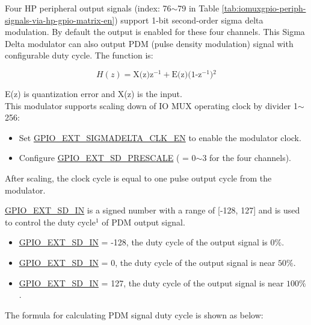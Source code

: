 \documentclass[main\_\_EN.tex]{subfiles}
\begin{document}
Four HP peripheral output signals (index: 76$\sim$79 in Table \ref{tab:iomuxgpio-periph-signals-via-hp-gpio-matrix-en}) support 1-bit second-order sigma delta modulation. By default the output is enabled for these four channels. This Sigma Delta modulator can also output PDM (pulse density modulation) signal with configurable duty cycle. The function is:

\[
    H(z)=\textrm{X(z)z$^{-1}$} + \textrm{E(z)(1-z$^{-1}$)$^{2}$}
    \]

E(z) is quantization error and X(z) is the input.\\
This modulator supports scaling down of IO MUX operating clock by divider 1$\sim$256:
\begin{itemize}
    \item Set  \hyperref[fielddesc:GPIOEXTSIGMADELTACLKEN]{GPIO\_EXT\_SIGMADELTA\_CLK\_EN} to enable the modulator clock.
    \item Configure \hyperref[fielddesc:GPIOEXTSDNPRESCALE]{GPIO\_EXT\_SD\_PRESCALE} ( = 0$\sim$3 for the four channels).
\end{itemize}

After scaling, the clock cycle is equal to one pulse output cycle from the modulator.

\hyperref[fielddesc:GPIOEXTSDNIN]{GPIO\_EXT\_SD\_IN} is a signed number with a range of [-128, 127] and is used to control the duty cycle$^{1}$ of PDM output signal.

\begin{itemize}
    \item \hyperref[fielddesc:GPIOEXTSDNIN]{GPIO\_EXT\_SD\_IN} = -128, the duty cycle of the output signal is \begin{math}0\% \end{math}.
    \item \hyperref[fielddesc:GPIOEXTSDNIN]{GPIO\_EXT\_SD\_IN} = 0, the duty cycle of the output signal is near \begin{math}50\% \end{math}.
    \item \hyperref[fielddesc:GPIOEXTSDNIN]{GPIO\_EXT\_SD\_IN} = 127, the duty cycle of the output signal is near \begin{math}100\% \end{math}.
\end{itemize}

The formula for calculating PDM signal duty cycle is shown as below:
\end{document}

